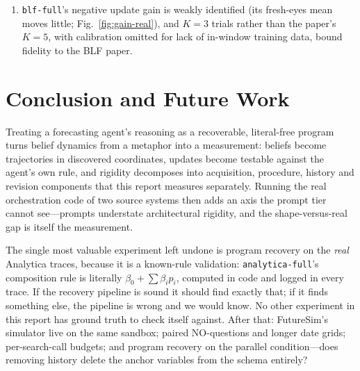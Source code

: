 \documentclass[10pt]{article}
\newcommand{\hr}[1]{\texttt{#1}}
\begin{document}
\begin{enumerate}
outcomes it generates itself, and---most consequentially for us---\emph{chooses when to update}
via \texttt{next\_day}, whereas our shape is forced to emit a forecast on every date. FutureSim's
own anchoring finding is partly about agents declining to update at all, a behaviour our shape
cannot exhibit by construction. The direction of the correction is therefore unpredictable,
unlike the Analytica and BLF cases where the architecture could only add rigidity. The
integration needed to close this gap is built and passes a structural dry run
(\S\ref{sec:tierB}); only the paid run is outstanding. E2 and the probe likewise remain
prompt-tier throughout.
\item \hr{blf-full}'s negative update gain is weakly identified (its fresh-eyes mean moves little;
Fig.~\ref{fig:gain-real}), and $K{=}3$ trials rather than the paper's $K{=}5$, with calibration
omitted for lack of in-window training data, bound fidelity to the BLF paper.
\end{enumerate}

\section{Conclusion and Future Work}
Treating a forecasting agent's reasoning as a recoverable, literal-free program turns belief
dynamics from a metaphor into a measurement: beliefs become trajectories in discovered
coordinates, updates become testable against the agent's own rule, and rigidity decomposes into
acquisition, procedure, history and revision components that this report measures separately.
Running the real orchestration code of two source systems then adds an axis the prompt tier cannot
see---prompts understate architectural rigidity, and the shape-versus-real gap is itself the
measurement.

The single most valuable experiment left undone is program recovery on the \emph{real} Analytica
traces, because it is a known-rule validation: \hr{analytica-full}'s composition rule is literally
$\beta_0+\sum\beta_ip_i$, computed in code and logged in every trace. If the recovery pipeline is
sound it should find exactly that; if it finds something else, the pipeline is wrong and we would
know. No other experiment in this report has ground truth to check itself against. After that:
FutureSim's simulator live on the same sandbox; paired NO-questions and longer date grids;
per-search-call budgets; and program recovery on the parallel condition---does removing history
delete the anchor variables from the schema entirely?
\end{document}
